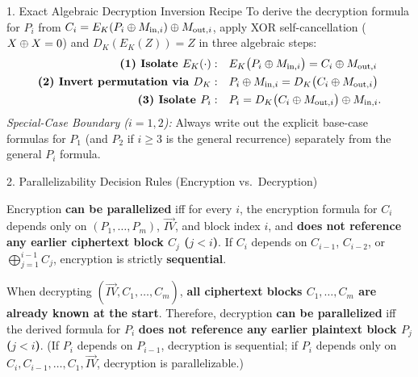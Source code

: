 \begin{summarybox}{1. Exact Algebraic Decryption Inversion Recipe}
To derive the decryption formula for $P_i$ from $C_i = E_K(P_i \oplus M_{\text{in}, i}) \oplus M_{\text{out}, i}$, apply XOR self-cancellation ($X \oplus X = 0$) and $D_K(E_K(Z)) = Z$ in three algebraic steps:
\begin{align*}
  \textbf{(1) Isolate } E_K(\cdot): \quad & E_K\big(P_i \oplus M_{\text{in}, i}\big) = C_i \oplus M_{\text{out}, i} \\
  \textbf{(2) Invert permutation via } D_K: \quad & P_i \oplus M_{\text{in}, i} = D_K\big(C_i \oplus M_{\text{out}, i}\big) \\
  \textbf{(3) Isolate } P_i: \quad & P_i = D_K\big(C_i \oplus M_{\text{out}, i}\big) \oplus M_{\text{in}, i}.
\end{align*}
\emph{Special-Case Boundary ($i=1, 2$):} Always write out the explicit base-case formulas for $P_1$ (and $P_2$ if $i \ge 3$ is the general recurrence) separately from the general $P_i$ formula.
\end{summarybox}

\begin{summarybox}{2. Parallelizability Decision Rules (Encryption vs.\ Decryption)}
\begin{compactitem}
  \item {} Encryption \textbf{can be parallelized} iff for every $i$, the encryption formula for $C_i$ depends only on $(P_1, \dots, P_m)$, $\overrightarrow{IV}$, and block index $i$, and \textbf{does not reference any earlier ciphertext block $C_j$ ($j < i$)}. If $C_i$ depends on $C_{i-1}$, $C_{i-2}$, or $\bigoplus_{j=1}^{i-1} C_j$, encryption is strictly \textbf{sequential}.
  \item {} When decrypting $(\overrightarrow{IV}, C_1, \dots, C_m)$, \textbf{all ciphertext blocks $C_1, \dots, C_m$ are already known at the start}. Therefore, decryption \textbf{can be parallelized} iff the derived formula for $P_i$ \textbf{does not reference any earlier plaintext block $P_j$ ($j < i$)}. (If $P_i$ depends on $P_{i-1}$, decryption is sequential; if $P_i$ depends only on $C_i, C_{i-1}, \dots, C_1, \overrightarrow{IV}$, decryption is parallelizable.)
\end{compactitem}
\end{summarybox}

